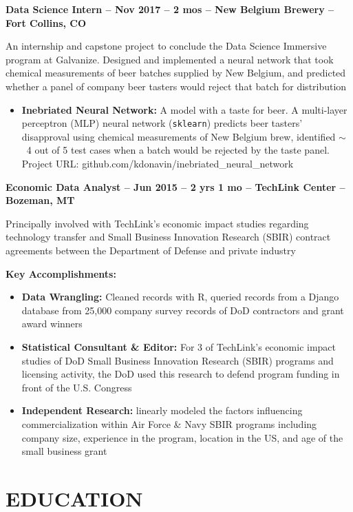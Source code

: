 \documentclass[resmargin, centered, 10pt]{res}
\def \subwidth{13.5cm}
\newcommand{\tab}[1][1cm]{\hspace*{#1}}
\newcommand{\loose}{\vspace{0.5cm}}
\newcommand{\subtext}[1]{\tab[0.5cm] \parbox{\subwidth{}}{#1}}
\begin{document}
\begin{resume}
\textbf{Data Science Intern --  Nov 2017 -- 2 mos -- New Belgium Brewery -- Fort Collins, CO}

\subtext{An internship and capstone project to conclude the Data Science Immersive program at Galvanize. Designed and implemented a neural network that took chemical measurements of beer batches supplied by New Belgium, and predicted whether a panel of company beer tasters would reject that batch for distribution}

\begin{itemize}
	\item \textbf{Inebriated Neural Network:} A model with a taste for beer. A multi-layer perceptron (MLP) neural network (\texttt{sklearn}) predicts beer tasters’ disapproval using chemical measurements of New Belgium brew, identified $\sim$\hspace{-1mm}~4 out of 5 test cases when a batch would be rejected by the taste panel. Project URL: github.com/kdonavin/inebriated\_neural\_network
\end{itemize}

\textbf{Economic Data Analyst -- Jun 2015 -- 2 yrs 1 mo -- TechLink Center -- Bozeman, MT}

\subtext{
	Principally involved with TechLink's economic impact studies regarding technology transfer and Small Business Innovation Research (SBIR) contract agreements between the Department of Defense and private industry
}

\subtext{\textbf{Key Accomplishments:}}
	
\begin{itemize}
	\item \textbf{Data Wrangling:} Cleaned records with R, queried records from a Django database from 25,000 company survey records of DoD contractors and grant award winners
	\item \textbf{Statistical Consultant \& Editor:} For 3 of TechLink’s economic impact studies of DoD Small Business Innovation Research (SBIR) programs and licensing activity, the DoD used this research to defend program funding in front of the U.S. Congress
	\item \textbf{Independent Research:} linearly modeled the factors influencing commercialization within Air Force \& Navy SBIR programs including company size, experience in the program, location in the US, and age of the small business grant
\end{itemize} 

\loose
\fullline
\section{EDUCATION}


\end{resume}
\end{document}
